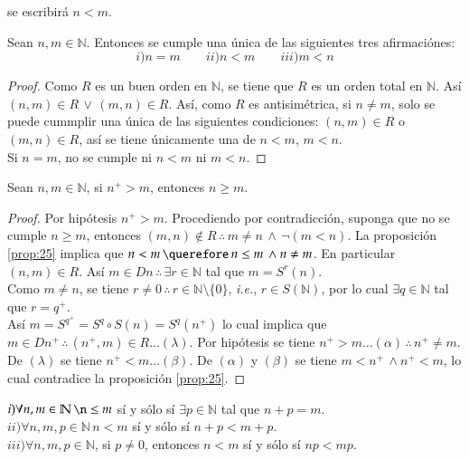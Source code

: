 se escribirá $n < m$.
\begin{proposition} \label{prop:25} Sean $n,m \in \mathbb{N}$. Entonces se
    cumple una única de las siguientes tres afirmaciónes:
    \[
        i) n=m \quad \quad ii) n<m \quad \quad iii) m<n
    \]
\end{proposition}
\begin{proof}
    Como $R$ es un buen orden en $\mathbb{N}$, se tiene que $R$ es un orden
    total en $\mathbb{N}$. Así $(n,m)\in R \, \lor \, (m,n) \in R$. Así, como
    $R$ es antisimétrica, si $n \neq m$, solo se puede cummplir una única de las
    siguientes condiciones: $(n,m)\in R$ o $(m,n)\in R$, así se tiene únicamente
    una de $n<m$, $m<n$.\\
    Si $n=m$, no se cumple ni $n<m$ ni $m<n$. 
\end{proof}
\begin{proposition}\label{prop:26} Sean $n, m \in \mathbb{N}$, si $n^+ >m$,
    entonces $n \geq m$. 
\end{proposition}
\begin{proof}
    Por hipótesis $n^+ > m$. Procediendo por contradicción, suponga que no se
    cumple $n \geq m$, entonces $(m,n)\notin R\, \therefore \, m \neq n \, \land
    \, \neg (m<n)$. La proposición \ref{prop:25} implica que $n<m  \, \querefore
    \, n \leq m \, \land n \neq m$. En particular $(n,m)\in R$. Así $m \in Dn \,
    \therefore \, \exists r \in \mathbb{N}$ tal que $m = S^r(n)$. \\
    Como $m \neq n $, se tiene $r \neq 0\, \therefore \, r \in \mathbb{N}
    \setminus \{0\}$, \textit{i.e.}, $r \in S(\mathbb{N})$, por lo cual $\exists q \in
    \mathbb{N}$ tal que $r = q^+$. \\
    Así $m= S^{q^+}= S^q \circ S(n) = S^q(n^+)$ lo cual implica que $m \in Dn^+
    \, \therefore \, (n^+,m) \in R \ldots (\lambda)$. Por hipótesis se tiene
    $n^+ > m \ldots (\alpha)\, \therefore \, n^+ \neq m$. De $(\lambda)$ se
    tiene $n^+ < m \ldots (\beta)$. De $(\alpha)$ y $(\beta)$ se tiene $m < n^+
    \, \land n^+ < m$, lo cual contradice la proposición \ref{prop:25}.
\end{proof}
\begin{proposition} \label{prop:27} 
    $i) \forall  n,m \in \mathbb{N} \, \n \leq m$ sí y sólo sí $\exists p \in
    \mathbb{N}$ tal que $n + p=m$. \\
    $ii) \forall n,m,p \in \mathbb{N} \, n <m$ sí y sólo sí $n +p < m +p$. \\
    $iii) \forall n,m,p \in \mathbb{N}$, si $p \neq 0$, entonces $n <m$ sí y
    sólo sí $np<mp$. 
\end{proposition}
